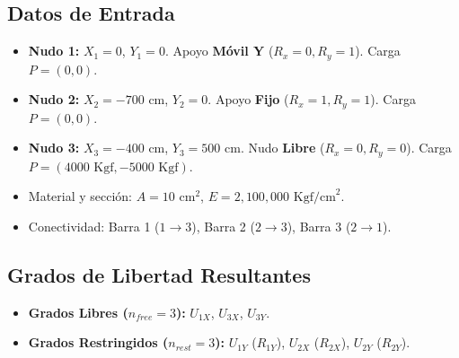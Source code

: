 \documentclass[11pt,a4paper]{article}
\begin{document}
\subsection{Datos de Entrada}
\begin{itemize}
    \item \textbf{Nudo 1:} $X_1 = 0$, $Y_1 = 0$. Apoyo \textbf{Móvil Y} ($R_x=0, R_y=1$). Carga $P = (0, 0)$.
    \item \textbf{Nudo 2:} $X_2 = -700\text{ cm}$, $Y_2 = 0$. Apoyo \textbf{Fijo} ($R_x=1, R_y=1$). Carga $P = (0, 0)$.
    \item \textbf{Nudo 3:} $X_3 = -400\text{ cm}$, $Y_3 = 500\text{ cm}$. Nudo \textbf{Libre} ($R_x=0, R_y=0$). Carga $P = (4000\text{ Kgf}, -5000\text{ Kgf})$.
    \item Material y sección: $A = 10\text{ cm}^2$, $E = 2,100,000\text{ Kgf/cm}^2$.
    \item Conectividad: Barra 1 ($1 \to 3$), Barra 2 ($2 \to 3$), Barra 3 ($2 \to 1$).
\end{itemize}

\subsection{Grados de Libertad Resultantes}
\begin{itemize}
    \item \textbf{Grados Libres ($n_{free} = 3$):} $U_{1X}$, $U_{3X}$, $U_{3Y}$.
    \item \textbf{Grados Restringidos ($n_{rest} = 3$):} $U_{1Y}$ ($R_{1Y}$), $U_{2X}$ ($R_{2X}$), $U_{2Y}$ ($R_{2Y}$).
\end{itemize}
\end{document}
